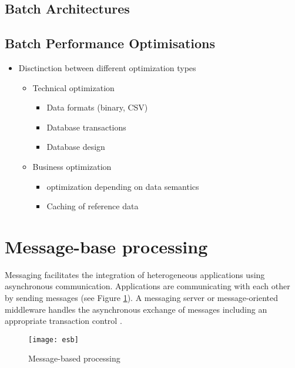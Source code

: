 \subsection{Batch Architectures}

\subsection{Batch Performance Optimisations}

\begin{itemize}
	\item Disctinction between different optimization types
	\begin{itemize}
		\item Technical optimization
		\begin{itemize}
			\item Data formats (binary, CSV)
			\item Database transactions
			\item Database design
		\end{itemize}
		\item Business optimization
		\begin{itemize}
			\item optimization depending on data semantics
			\item Caching of reference data
		\end{itemize}
	\end{itemize}
\end{itemize}

\section{Message-base processing}\label{sec:message_processing}
Messaging facilitates the integration of heterogeneous applications using asynchronous communication. Applications are communicating with each other by sending messages (see Figure \ref{fig:message_based_processing}). A messaging server or message-oriented middleware handles the asynchronous exchange of messages including an appropriate transaction control \cite{conrad2006enterprise}.

\begin{figure}[htbp]
	\centering
	\texttt{[image: esb]}
	\caption{Message-based processing}
	\label{fig:message_based_processing}
\end{figure}

